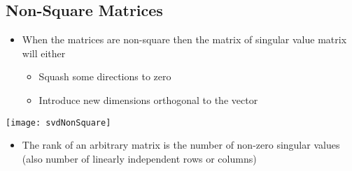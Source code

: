 \begin{slide}
\section[-2]{Non-Square Matrices}

\begin{PauseHighLight}
  \begin{itemize}
  \item When the matrices are non-square then the matrix of singular
    value matrix will either
    \begin{itemize}
    \item Squash some directions to zero\pause
    \item Introduce new dimensions orthogonal to the vector
    \end{itemize}
  \end{itemize}
\end{PauseHighLight}
\begin{center}
  \texttt{[image: svdNonSquare]}\pause
\end{center}
\begin{PauseHighLight}
  \begin{itemize}
  \item The rank of an arbitrary matrix is the number of non-zero singular values
    (also number of linearly independent rows or columns)\pause
  \end{itemize}
\end{PauseHighLight}

\end{slide}



